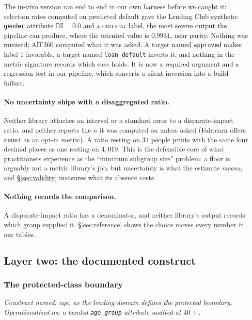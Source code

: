 \documentclass[sigconf,nonacm]{acmart}
\begin{document}
The in-vivo version ran end to end in our own harness before we caught it:
selection rates computed on predicted default gave the Lending Club synthetic
\texttt{gender} attribute $\mathrm{DI}=0.0$ and a \textsc{critical} label,
the most severe output the pipeline can produce, where the oriented value
is $0.9931$, near parity. Nothing was misused; AIF360 computed what it was
asked. A target named \texttt{approved} makes label $1$ favorable, a target
named \texttt{loan\_default} inverts it, and nothing in the metric signature
records which case holds. It is now a required argument and a regression test
in our pipeline, which converts a silent inversion into a build failure.

\paragraph{No uncertainty ships with a disaggregated ratio.} Neither library
attaches an interval or a standard error to a disparate-impact ratio, and
neither reports the $n$ it was computed on unless asked (Fairlearn offers
\texttt{count} as an opt-in metric). A ratio resting on $31$ people prints
with the same four decimal places as one resting on $4{,}019$. This is the
defensible core of what practitioners experience as the ``minimum subgroup
size'' problem: a floor is arguably not a metric library's job, but
uncertainty is what the estimate \emph{means}, and \S\ref{sec:validity}
measures what its absence costs.

\paragraph{Nothing records the comparison.} A disparate-impact ratio has a
denominator, and neither library's output records which group supplied it.
\S\ref{sec:reference} shows the choice moves every number in our tables.

\subsection{Layer two: the documented construct}
\label{sec:statute}

\subsubsection{The protected-class boundary}
\label{sec:age}

\emph{Construct named: age, as the lending domain defines the protected
boundary. Operationalised as: a banded \texttt{age\_group} attribute audited
at $40{+}$.}
\end{document}
